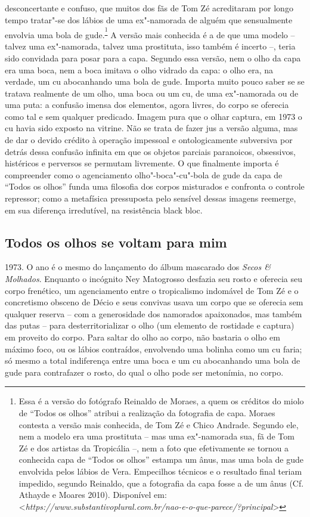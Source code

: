 desconcertante e confuso, que muitos dos fãs de Tom Zé acreditaram por
longo tempo tratar"-se dos lábios de uma ex"-namorada de alguém que
sensualmente envolvia uma bola de gude.\textsuperscript{\footnote{Essa é
  a versão do fotógrafo Reinaldo de Moraes, a quem os créditos do miolo
  de ``Todos os olhos'' atribui a realização da fotografia de capa.
  Moraes contesta a versão mais conhecida, de Tom Zé e Chico Andrade.
  Segundo ele, nem a modelo era uma prostituta -- mas uma ex"-namorada
  sua, fã de Tom Zé e dos artistas da Tropicália --, nem a foto que
  efetivamente se tornou a conhecida capa de ``Todos os olhos'' estampa
  um ânus, mas uma bola de gude envolvida pelos lábios de Vera.
  Empecilhos técnicos e o resultado final teriam impedido, segundo
  Reinaldo, que a fotografia da capa fosse a de um ânus (Cf. Athayde e
  Moares 2010). Disponível em:
  \textless{}{\emph{https://www.substantivoplural.com.br/nao-e-o-que-parece/?principal}}\textgreater{}}}
A versão mais conhecida é a de que uma modelo -- talvez uma ex"-namorada,
talvez uma prostituta, isso também é incerto --, teria sido convidada
para posar para a capa. Segundo essa versão, nem o olho da capa era uma
boca, nem a boca imitava o olho vidrado da capa: o olho era, na verdade,
um cu abocanhando uma bola de gude. Importa muito pouco saber se se
tratava realmente de um olho, uma boca ou um cu, de uma ex"-namorada ou
de uma puta: a confusão imensa dos elementos, agora livres, do corpo se
oferecia como tal e sem qualquer predicado. Imagem pura que o olhar
captura, em 1973 o cu havia sido exposto na vitrine. Não se trata de
fazer jus a versão alguma, mas de dar o devido crédito à operação
impessoal e ontologicamente subversiva por detrás dessa confusão
infinita em que os objetos parciais paranoicos, obsessivos, histéricos e
perversos se permutam livremente. O que finalmente importa é compreender
como o agenciamento olho"-boca"-cu"-bola de gude da capa de ``Todos os
olhos'' funda uma filosofia dos corpos misturados e confronta o controle
repressor; como a metafísica pressuposta pelo sensível dessas imagens
reemerge, em sua diferença irredutível, na resistência black bloc.

\subsection{Todos os olhos se voltam para mim}

1973. O ano é o
mesmo do lançamento do álbum mascarado dos \emph{Secos \& Molhados}.
Enquanto o incógnito Ney Matogrosso desfazia seu rosto e oferecia seu
corpo frenético, um agenciamento entre o tropicalismo indomável de Tom
Zé e o concretismo obsceno de Décio e seus convivas usava um corpo que
se oferecia sem qualquer reserva -- com a generosidade dos namorados
apaixonados, mas também das putas -- para desterritorializar o olho (um
elemento de rostidade e captura) em proveito do corpo. Para saltar do
olho ao corpo, não bastaria o olho em máximo foco, ou os lábios
contraídos, envolvendo uma bolinha como um cu faria; só mesmo a total
indiferença entre uma boca e um cu abocanhando uma bola de gude para
contrafazer o rosto, do qual o olho pode ser metonímia, no corpo.

